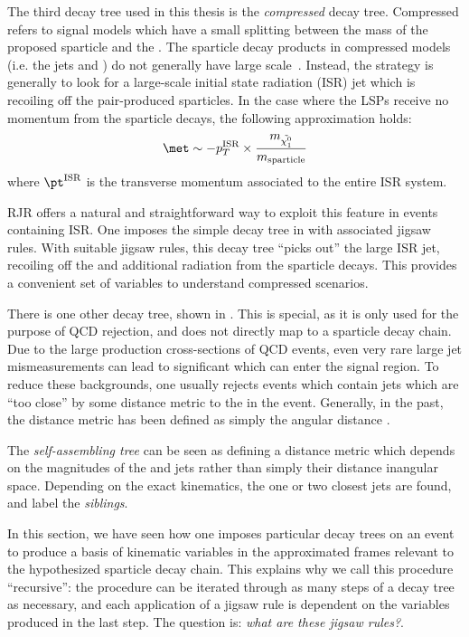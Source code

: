The third decay tree used in this thesis is the \textit{compressed} decay tree.
Compressed refers to signal models which have a small splitting between the mass of the proposed sparticle and the \lsp.
The sparticle decay products in compressed models (i.e. the jets and \met) do not generally have large scale~\cite{Jackson:2016mfb}.
Instead, the strategy is generally to look for a large-scale initial state radiation (ISR) jet which is recoiling off the pair-produced sparticles.
In the case where the LSPs receive no momentum from the sparticle decays, the following approximation holds:
\begin{align}
\met \order -p_T^{\text{ISR}} \times \frac{m_{\lsp} }{m_{\text{sparticle}}}
\end{align}
where $\pt^{\text{ISR}}$ is the transverse momentum associated to the entire ISR system.

RJR offers a natural and straightforward way to exploit this feature in events containing ISR.
One imposes the simple decay tree in  with associated jigsaw rules.
With suitable jigsaw rules, this decay tree ``picks out'' the large \pt ISR jet, recoiling off the \met and additional radiation from the sparticle decays.
This provides a convenient set of variables to understand compressed scenarios.

There is one other decay tree, shown in .
This is special, as it is only used for the purpose of QCD rejection, and does not directly map to a sparticle decay chain.
Due to the large production cross-sections of QCD events, even very rare large jet mismeasurements can lead to significant \met which can enter the signal region.
To reduce these backgrounds, one usually rejects events which contain jets which are ``too close'' by some distance metric to the \met in the event.
Generally, in the past, the distance metric has been defined as simply the angular distance \deltaR.

The \textit{self-assembling tree} can be seen as defining a distance metric which depends on the magnitudes of the \met and jets rather than simply their distance inangular space.
Depending on the exact kinematics, the one or two closest jets are found, and label the \met \textit{siblings}.

In this section, we have seen how one imposes particular decay trees on an event to produce a basis of kinematic variables in the approximated frames relevant to the hypothesized sparticle decay chain.
This explains why we call this procedure ``recursive'': the procedure can be iterated through as many steps of a decay tree as necessary, and each application of a jigsaw rule is dependent on the variables produced in the last step.
The question is: \textit{what are these jigsaw rules?}.

